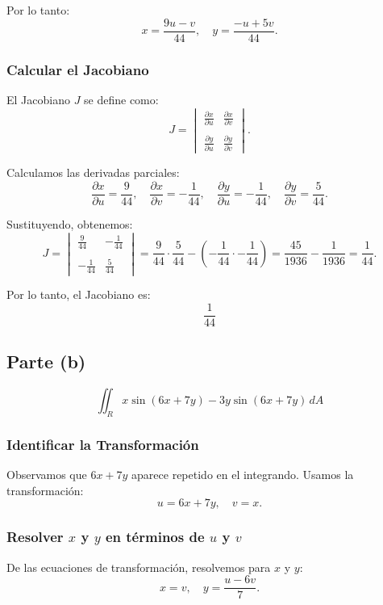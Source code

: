 Por lo tanto:
\[
x = \frac{9u - v}{44}, \quad y = \frac{-u + 5v}{44}.
\]



\subsubsection*{Calcular el Jacobiano}
El Jacobiano \(J\) se define como:
\[
J = \begin{vmatrix}
\frac{\partial x}{\partial u} & \frac{\partial x}{\partial v} \\\\
\frac{\partial y}{\partial u} & \frac{\partial y}{\partial v}
\end{vmatrix}.
\]

Calculamos las derivadas parciales:
\[
\frac{\partial x}{\partial u} = \frac{9}{44}, \quad \frac{\partial x}{\partial v} = -\frac{1}{44}, \quad \frac{\partial y}{\partial u} = -\frac{1}{44}, \quad \frac{\partial y}{\partial v} = \frac{5}{44}.
\]

Sustituyendo, obtenemos:
\[
J = \begin{vmatrix}
\frac{9}{44} & -\frac{1}{44} \\\\
-\frac{1}{44} & \frac{5}{44}
\end{vmatrix} = \frac{9}{44} \cdot \frac{5}{44} - \left(-\frac{1}{44} \cdot -\frac{1}{44}\right) = \frac{45}{1936} - \frac{1}{1936} = \frac{1}{44}.
\]

Por lo tanto, el Jacobiano es:
\[
\boxed{\frac{1}{44}}
\]

\subsection*{Parte (b)}
\[
\iint_R x \sin(6x + 7y) - 3y \sin(6x + 7y) \, dA
\]

\subsubsection*{Identificar la Transformación}
Observamos que \(6x + 7y\) aparece repetido en el integrando. Usamos la transformación:
\[
u = 6x + 7y, \quad v = x.
\]

\subsubsection*{Resolver \(x\) y \(y\) en términos de \(u\) y \(v\)}
De las ecuaciones de transformación, resolvemos para \(x\) y \(y\):
\[
x = v, \quad y = \frac{u - 6v}{7}.
\]

